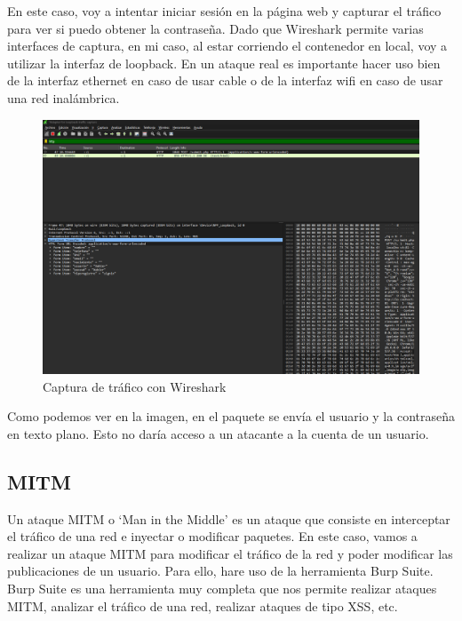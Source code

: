 \documentclass{report}
\begin{document}
                En este caso, voy a intentar iniciar sesión en la página web y capturar el tráfico para ver si puedo obtener la contraseña.
                Dado que Wireshark permite varias interfaces de captura, en mi caso, al estar corriendo el contenedor en local, voy a utilizar la interfaz de loopback.
                En un ataque real es importante hacer uso bien de la interfaz ethernet en caso de usar cable o de la interfaz wifi en caso de usar una red inalámbrica.
                \begin{figure}[H]
                    \centering
                    \includegraphics[width=1\textwidth]{./img/vulnerabilidades/2.2/1.1.png}
                    \caption{Captura de tráfico con Wireshark}
                \end{figure}
                Como podemos ver en la imagen, en el paquete se envía el usuario y la contraseña en texto plano.
                Esto no daría acceso a un atacante a la cuenta de un usuario.\\
            \clearpage
            \subsection{MITM}
                Un ataque MITM o ‘Man in the Middle’ es un ataque que consiste en interceptar el tráfico de una red e inyectar o modificar paquetes.
                En este caso, vamos a realizar un ataque MITM para modificar el tráfico de la red y poder modificar las publicaciones de un usuario.
                Para ello, hare uso de la herramienta Burp Suite.
                Burp Suite es una herramienta muy completa que nos permite realizar ataques MITM, analizar el tráfico de una red, realizar ataques de tipo XSS, etc.\\
\end{document}
